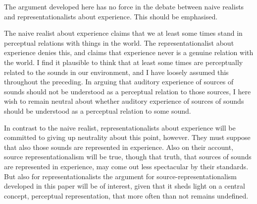 \documentclass[sloppy, journal, git, bytitle, dodraft]{humapap}
\begin{document}
The argument developed here has no force in the debate between naive realists and representationalists about experience. This should be emphasised. 

The naive realist about experience claims that we at least some times stand in perceptual relations with things in the world. The representationalist about experience denies this, and claims that experience never is a genuine relation with the world. I find it plausible to think that at least some times are perceptually related to the sounds in our environment, and I have loosely assumed this throughout the preceding. In arguing that auditory experience of sources of sounds should not be understood as a perceptual relation to those sources, I here wish to remain neutral about whether auditory experience of sources of sounds should be understood as a perceptual relation to some sound. 

In contrast to the naive realist, representationalists about experience will be committed to giving up neutrality about this point, however. They must suppose that also those sounds are represented in experience. Also on their account, source representationalism will be true, though that truth, that sources of sounds are represented in experience, may come out less spectacular by their standards. But also for representationalists the argument for source-representationalism developed in this paper will be of interest, given that it sheds light on a central concept, perceptual representation, that more often than not remains undefined. 




% 
% 
% 


\printbibliography
\end{document}
